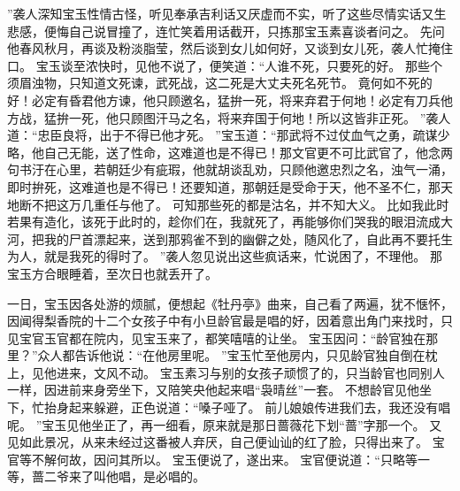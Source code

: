 ”袭人深知宝玉性情古怪，听见奉承吉利话又厌虚而不实，听了这些尽情实话又生悲感，便悔自己说冒撞了，连忙笑着用话截开，只拣那宝玉素喜谈者问之。
先问他春风秋月，再谈及粉淡脂莹，然后谈到女儿如何好，又谈到女儿死，袭人忙掩住口。
宝玉谈至浓快时，见他不说了，便笑道：“人谁不死，只要死的好。
那些个须眉浊物，只知道文死谏，武死战，这二死是大丈夫死名死节。
竟何如不死的好！必定有昏君他方谏，他只顾邀名，猛拚一死，将来弃君于何地！必定有刀兵他方战，猛拚一死，他只顾图汗马之名，将来弃国于何地！所以这皆非正死。
”袭人道：“忠臣良将，出于不得已他才死。
”宝玉道：“那武将不过仗血气之勇，疏谋少略，他自己无能，送了性命，这难道也是不得已！那文官更不可比武官了，他念两句书汙在心里，若朝廷少有疵瑕，他就胡谈乱劝，只顾他邀忠烈之名，浊气一涌，即时拚死，这难道也是不得已！还要知道，那朝廷是受命于天，他不圣不仁，那天地断不把这万几重任与他了。
可知那些死的都是沽名，并不知大义。
比如我此时若果有造化，该死于此时的，趁你们在，我就死了，再能够你们哭我的眼泪流成大河，把我的尸首漂起来，送到那鸦雀不到的幽僻之处，随风化了，自此再不要托生为人，就是我死的得时了。
”袭人忽见说出这些疯话来，忙说困了，不理他。
那宝玉方合眼睡着，至次日也就丢开了。
\par
一日，宝玉因各处游的烦腻，便想起《牡丹亭》曲来，自己看了两遍，犹不惬怀，因闻得梨香院的十二个女孩子中有小旦龄官最是唱的好，因着意出角门来找时，只见宝官玉官都在院内，见宝玉来了，都笑嘻嘻的让坐。
宝玉因问：“龄官独在那里？”众人都告诉他说：“在他房里呢。
”宝玉忙至他房内，只见龄官独自倒在枕上，见他进来，文风不动。
宝玉素习与别的女孩子顽惯了的，只当龄官也同别人一样，因进前来身旁坐下，又陪笑央他起来唱“袅晴丝”一套。
不想龄官见他坐下，忙抬身起来躲避，正色说道：“嗓子哑了。
前儿娘娘传进我们去，我还没有唱呢。
”宝玉见他坐正了，再一细看，原来就是那日蔷薇花下划“蔷”字那一个。
又见如此景况，从来未经过这番被人弃厌，自己便讪讪的红了脸，只得出来了。
宝官等不解何故，因问其所以。
宝玉便说了，遂出来。
宝官便说道：“只略等一等，蔷二爷来了叫他唱，是必唱的。
